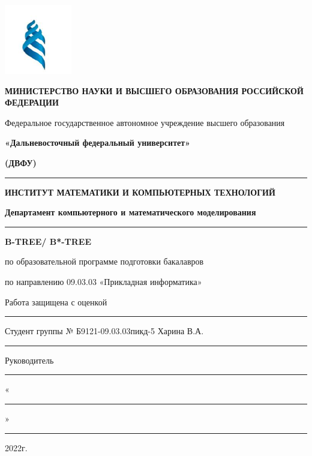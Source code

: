 \begin{titlepage}
    \begin{center}
        
        \centering
        \includegraphics[width=0.3\linewidth]{im1.png}
        
        \par
        \textbf{МИНИСТЕРСТВО НАУКИ И ВЫСШЕГО ОБРАЗОВАНИЯ РОССИЙСКОЙ ФЕДЕРАЦИИ}\par
        \vspace{0.5cm}
        Федеральное государственное автономное учреждение высшего образования \par
        \textbf{«Дальневосточный федеральный университет»} \par
        \textbf{(ДВФУ)}\par
        \rule{13cm}{0.1cm}
        \par
        \vspace{1.5cm}
        
        \textbf{ИНСТИТУТ МАТЕМАТИКИ И КОМПЬЮТЕРНЫХ ТЕХНОЛОГИЙ}\par
        \textbf{Департамент компьютерного и математического моделирования}
        \rule{13cm}{0.001cm}
        \par
        \vspace{3cm}
        \textbf{ B-TREE/ B*-TREE}\par
        \vspace{0.5cm}
        по образовательной программе подготовки бакалавров \par
        по направлению 09.03.03 «Прикладная информатика»\par
        \vspace{0.5cm}
        Работа защищена с оценкой  \rule{1.6cm}{0.001cm}
        \par
        \vspace{0.5cm}
        Студент группы № Б9121-09.03.03пикд-5 Харина В.А. \rule{1.6cm}{0.001cm} 
        \par
        \vspace{0.5cm}
        Руководитель \rule{9cm}{0.001cm}
        \par
        \vspace{0.5cm}
        «\rule{1cm}{0.001cm}» \rule{6cm}{0.01cm} 2022г.

        
        
    \end{center}
\end{titlepage}